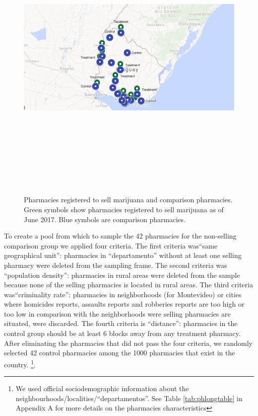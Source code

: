 \documentclass[11pt]{article}
\begin{document}
\begin{figure}[htpb!]
    \centering
     \label{fig:ctrltrtpharms_1}
    \includegraphics[width=6in,height=5.6851in]{./media/country.png}
    \caption{Pharmacies registered to sell marijuana and comparison pharmacies. Green symbols show pharmacies registered to sell marijuana as of June 2017. Blue symbols are comparison pharmacies.}
\end{figure}

To create a pool from which to sample the 42 pharmacies for the non-selling comparison group we applied four criteria. The first criteria was``same  geographical unit'':  pharmacies in ``departamento'' without at least one selling pharmacy were deleted from the sampling frame. The second criteria was ``population density'':  pharmacies in rural areas were deleted from the sample because none of the selling pharmacies is located in rural areas. The third criteria was``criminality rate'': pharmacies in neighborhoods (for Montevideo) or   cities where homicides reports, assaults reports and robberies reports are too high or too low  in comparison with the neighborhoods were selling pharmacies are  situated, were discarded. The fourth criteria is ``distance'': pharmacies in the control group should be at least 6 blocks away from any treatment pharmacy. After eliminating the pharmacies that did not pass the four criteria, we randomly selected 42 control pharmacies among the 1000 pharmacies that exist in the country. \footnote{We used official sociodemographic information about the neighbourhoods/localities/``departamentos''. See Table \ref{tab:phlongtable} in Appendix A for more details on the pharmacies characteristics}.
\end{document}
